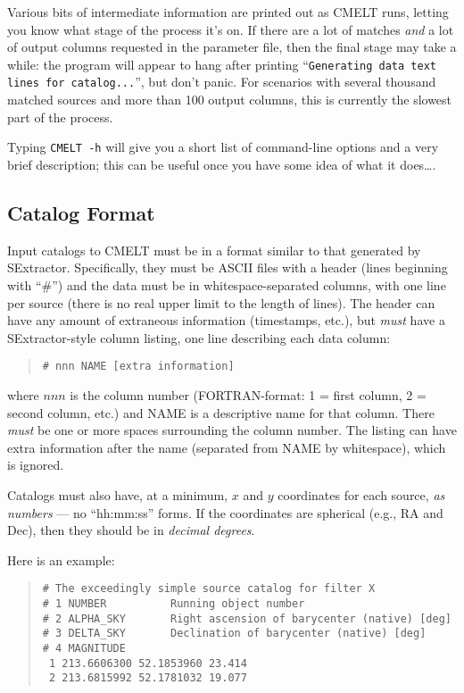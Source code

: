 \documentclass[10pt]{article}
\begin{document}
Various bits of intermediate information are printed out as CMELT
runs, letting you know what stage of the process it's on.  If there
are a lot of matches \textit{and} a lot of output columns requested in
the parameter file, then the final stage may take a while: the program
will appear to hang after printing ``\texttt{Generating data text
lines for catalog...}'', but don't panic.  For scenarios with several
thousand matched sources and more than 100 output columns, this is
currently the slowest part of the process.

Typing \texttt{CMELT -h} will give you a short list of command-line
options and a very brief description; this can be useful once you have
some idea of what it does\ldots.


\subsection{Catalog Format}

Input catalogs to CMELT must be in a format similar to that
generated by SExtractor.  Specifically, they must be ASCII files with
a header (lines beginning with ``\#'') and the data must be in
whitespace-separated columns, with one line per source (there is no
real upper limit to the length of lines).  The header can have any
amount of extraneous information (timestamps, etc.), but \textit{must}
have a SExtractor-style column listing, one line describing each data
column:
\begin{quote}
  \texttt{\#~nnn~NAME~[extra information]}
\end{quote}
where $nnn$ is the column number (FORTRAN-format: 1 = first column, 2
= second column, etc.)  and NAME is a descriptive name for that
column.  There \textit{must} be one or more spaces surrounding the
column number.  The listing can have extra information after the name
(separated from NAME by whitespace), which is ignored.

Catalogs must also have, at a minimum, $x$ and $y$ coordinates for
each source, \textit{as numbers} --- no ``hh:mm:ss'' forms.  If the
coordinates are spherical (e.g., RA and Dec), then they should be in
\textit{decimal degrees}.

Here is an example:
\begin{quote}
  \texttt{\# The exceedingly simple source catalog for filter X}\\
  \texttt{\#   1 NUMBER~~~~~~~~~~Running object number}\\
  \texttt{\#   2 ALPHA\_SKY~~~~~~~Right ascension of barycenter (native)          [deg]}\\
  \texttt{\#   3 DELTA\_SKY~~~~~~~Declination of barycenter (native)              [deg]}\\
  \texttt{\#   4 MAGNITUDE}\\
  \texttt{    1    213.6606300   52.1853960    23.414}\\
  \texttt{    2    213.6815992   52.1781032    19.077}\\
\end{quote}
\end{document}

